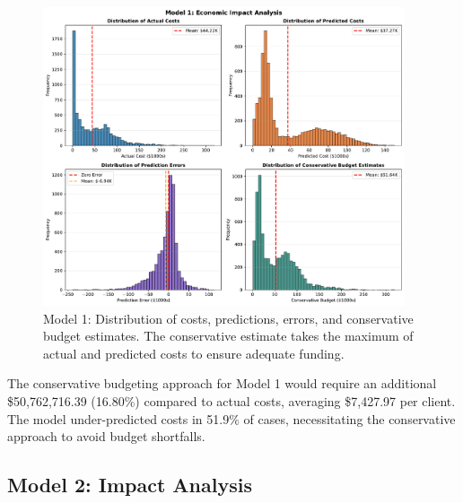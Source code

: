 \begin{figure}[htbp]
\centering
\includegraphics[width=0.95\textwidth]{figures/model_1_Impact_Histograms.pdf}
\caption{Model 1: Distribution of costs, predictions, errors, and conservative budget estimates. The conservative estimate takes the maximum of actual and predicted costs to ensure adequate funding.}
\label{fig:model1_impact_histograms}
\end{figure}

The conservative budgeting approach for Model 1 would require an additional \$50,762,716.39 (16.80\%) compared to actual costs, averaging \$7,427.97 per client. The model under-predicted costs in 51.9\% of cases, necessitating the conservative approach to avoid budget shortfalls.

\clearpage

\subsection{Model 2: Impact Analysis}
\label{subsec:model2_impact}

